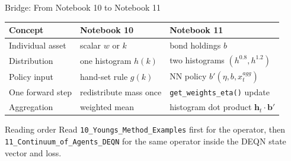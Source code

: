 \documentclass[aspectratio=169,11pt]{beamer}
\begin{document}
\begin{frame}{Bridge: From Notebook 10 to Notebook 11}
\footnotesize
\begin{center}
\renewcommand{\arraystretch}{1.08}
\begin{tabular}{@{}p{}p{}p{}@{}}
\toprule
\textbf{Concept} & \textbf{Notebook 10} & \textbf{Notebook 11} \\
\midrule
Individual asset & scalar $w$ or $k$ & bond holdings $b$ \\
Distribution & one histogram $h(k)$ & two histograms $(h^{0.8}, h^{1.2})$ \\
Policy input & hand-set rule $g(k)$ & NN policy $b'(\eta,b,x_t^{agg})$ \\
One forward step & redistribute mass once & \texttt{get\_weights\_eta()} update \\
Aggregation & weighted mean & histogram dot product $\mathbf{h}_t \cdot \mathbf{b}'$ \\
\bottomrule
\end{tabular}
\end{center}

\vspace{0.2em}
\begin{alertblock}{Reading order}
Read \texttt{10\_Youngs\_Method\_Examples} first for the operator, then \texttt{11\_Continuum\_of\_Agents\_DEQN} for the same operator inside the DEQN state vector and loss.
\end{alertblock}
\end{frame}
\end{document}
